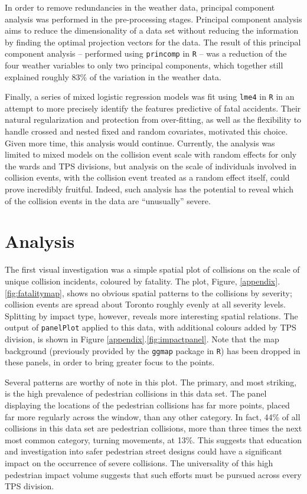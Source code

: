 \documentclass{article}
\begin{document}
In order to remove redundancies in the weather data, principal component analysis was performed in the pre-processing
stages. Principal component analysis aims to reduce the dimensionality of a data set without reducing the information by finding
the optimal projection vectors for the data. The result of this principal component analysis -- performed using \texttt{princomp}
in \texttt{R} --  was a reduction of the four weather variables to only two principal components, which together still explained
roughly 83\% of the variation in the weather data.

Finally, a series of mixed logistic regression models was fit using \texttt{lme4} in \texttt{R} in an attempt to more precisely
identify the features predictive of fatal accidents. Their natural regularization and protection from over-fitting, as well as the
flexibility to handle crossed and nested fixed and random covariates, motivated this choice. Given more time, this analysis would
continue. Currently, the analysis was limited to mixed models on the collision event scale with random effects for only the wards
and TPS divisions, but analysis on the scale of individuals involved in collision events, with the collision event treated as a
random effect itself, could prove incredibly fruitful. Indeed, such analysis has the potential to reveal which of the collision
events in the data are ``unusually'' severe.

\section{Analysis} \label{sec:analysis}

The first visual investigation was a simple spatial plot of collisions on the scale of unique collision incidents, coloured by
fatality. The plot, Figure, \ref{appendix}.\ref{fig:fatalitymap}, shows no obvious spatial patterns to the collisions by severity; collision events are spread about Toronto roughly evenly at all severity levels. Splitting by impact type, however, reveals more interesting
spatial relations. The output of \texttt{panelPlot} applied to this data, with additional colours added by TPS division, is shown
in Figure \ref{appendix}.\ref{fig:impactpanel}. Note that the map background (previously provided by the \texttt{ggmap} package in
\texttt{R}) has been dropped in these panels, in order to bring greater focus to the points.

Several patterns are worthy of note in this plot. The primary, and most striking, is the high prevalence of pedestrian collisions
in this data set. The panel displaying the locations of the pedestrian collisions has far more points, placed far more regularly
across the window, than any other category. In fact, 44\% of all collisions in this data set are pedestrian collisions, more than
three times the next most common category, turning movements, at 13\%. This suggests that education and investigation into safer
pedestrian street designs could have a significant impact on the occurrence of severe collisions. The universality of this high pedestrian impact volume suggests
that such efforts must be pursued across every TPS division.
\end{document}
